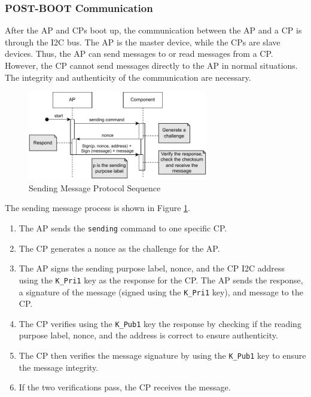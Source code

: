 \documentclass[11pt,oneside,onecolumn,letterpaper]{article}
\begin{document}
	\subsubsection{POST-BOOT Communication}
	After the AP and CPs boot up,
	the communication between the AP and a CP is through the I2C bus.
	The AP is the master device,
	while the CPs are slave devices.
	Thus,
	the AP can send messages to or read messages from a CP.
	However, the CP cannot send messages directly to the AP in normal situations.
	The integrity and authenticity of the communication are necessary.
	
	\begin{figure}[h]
		\centering
		\includegraphics[width=0.7\textwidth]{pics/post1.pdf}
		\caption{Sending Message Protocol Sequence}
		\label{fig:functionality_post1}
	\end{figure}
	
	The sending message process is shown in Figure \ref{fig:functionality_post1}.
	\begin{enumerate}
		\item The AP sends the \texttt{sending} command to one specific CP.
		\item The CP generates a nonce as the challenge for the AP.
		\item The AP signs the sending purpose label,
		nonce,
		and the CP I2C address using the \texttt{K\_Pri1} key as the response for the CP.
		The AP sends the response,
		a signature of the message (signed using the \texttt{K\_Pri1} key),
		and message to the CP.
		\item The CP verifies using the \texttt{K\_Pub1} key the response by checking if the reading purpose label,
		nonce,
		and the address is correct to ensure authenticity.
		\item The CP then verifies the message signature by using the \texttt{K\_Pub1} key to ensure the message integrity.
		\item If the two verifications pass,
		the CP receives the message.
	\end{enumerate}
	
\end{document}
